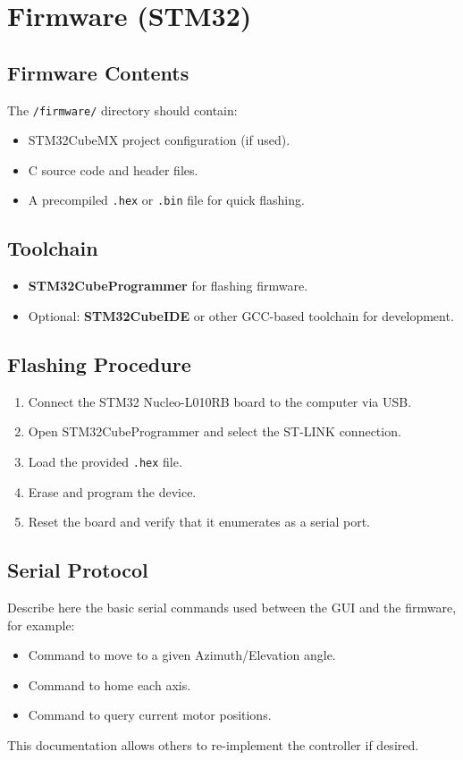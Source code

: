 \chapter{Firmware (STM32)}

\section{Firmware Contents}

The \texttt{/firmware/} directory should contain:

\begin{itemize}
  \item STM32CubeMX project configuration (if used).
  \item C source code and header files.
  \item A precompiled \texttt{.hex} or \texttt{.bin} file for quick flashing.
\end{itemize}

\section{Toolchain}

\begin{itemize}
  \item \textbf{STM32CubeProgrammer} for flashing firmware.
  \item Optional: \textbf{STM32CubeIDE} or other GCC-based toolchain for development.
\end{itemize}

\section{Flashing Procedure}

\begin{enumerate}
  \item Connect the STM32 Nucleo-L010RB board to the computer via USB.
  \item Open STM32CubeProgrammer and select the ST-LINK connection.
  \item Load the provided \texttt{.hex} file.
  \item Erase and program the device.
  \item Reset the board and verify that it enumerates as a serial port.
\end{enumerate}

\section{Serial Protocol} \label{sec:serial_protocol}

Describe here the basic serial commands used between the GUI and the firmware, for example:

\begin{itemize}
  \item Command to move to a given Azimuth/Elevation angle.
  \item Command to home each axis.
  \item Command to query current motor positions.
\end{itemize}

This documentation allows others to re-implement the controller if desired.
